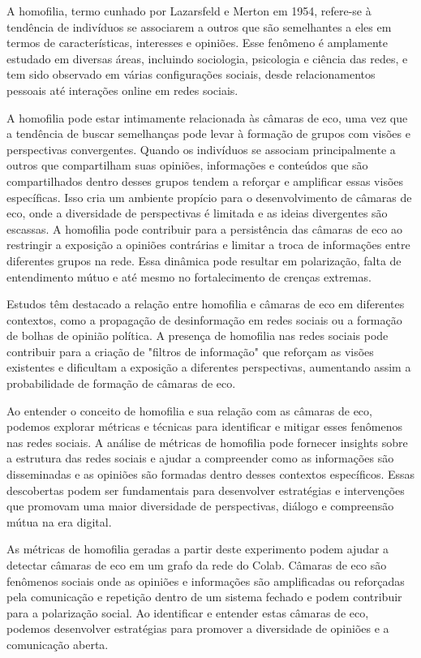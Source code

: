 A homofilia, termo cunhado por Lazarsfeld e Merton em 1954, refere-se à tendência de indivíduos se associarem a outros que são semelhantes a eles em termos de características, interesses e opiniões. Esse fenômeno é amplamente estudado em diversas áreas, incluindo sociologia, psicologia e ciência das redes, e tem sido observado em várias configurações sociais, desde relacionamentos pessoais até interações online em redes sociais.

A homofilia pode estar intimamente relacionada às câmaras de eco, uma vez que a tendência de buscar semelhanças pode levar à formação de grupos com visões e perspectivas convergentes. Quando os indivíduos se associam principalmente a outros que compartilham suas opiniões, informações e conteúdos que são compartilhados dentro desses grupos tendem a reforçar e amplificar essas visões específicas. Isso cria um ambiente propício para o desenvolvimento de câmaras de eco, onde a diversidade de perspectivas é limitada e as ideias divergentes são escassas. A homofilia pode contribuir para a persistência das câmaras de eco ao restringir a exposição a opiniões contrárias e limitar a troca de informações entre diferentes grupos na rede. Essa dinâmica pode resultar em polarização, falta de entendimento mútuo e até mesmo no fortalecimento de crenças extremas.

Estudos têm destacado a relação entre homofilia e câmaras de eco em diferentes contextos, como a propagação de desinformação em redes sociais ou a formação de bolhas de opinião política. A presença de homofilia nas redes sociais pode contribuir para a criação de "filtros de informação" que reforçam as visões existentes e dificultam a exposição a diferentes perspectivas, aumentando assim a probabilidade de formação de câmaras de eco.

Ao entender o conceito de homofilia e sua relação com as câmaras de eco, podemos explorar métricas e técnicas para identificar e mitigar esses fenômenos nas redes sociais. A análise de métricas de homofilia pode fornecer insights sobre a estrutura das redes sociais e ajudar a compreender como as informações são disseminadas e as opiniões são formadas dentro desses contextos específicos. Essas descobertas podem ser fundamentais para desenvolver estratégias e intervenções que promovam uma maior diversidade de perspectivas, diálogo e compreensão mútua na era digital.

As métricas de homofilia geradas a partir deste experimento podem ajudar a detectar câmaras de eco em um grafo da rede do Colab. Câmaras de eco são fenômenos sociais onde as opiniões e informações são amplificadas ou reforçadas pela comunicação e repetição dentro de um sistema fechado e podem contribuir para a polarização social. Ao identificar e entender estas câmaras de eco, podemos desenvolver estratégias para promover a diversidade de opiniões e a comunicação aberta.

